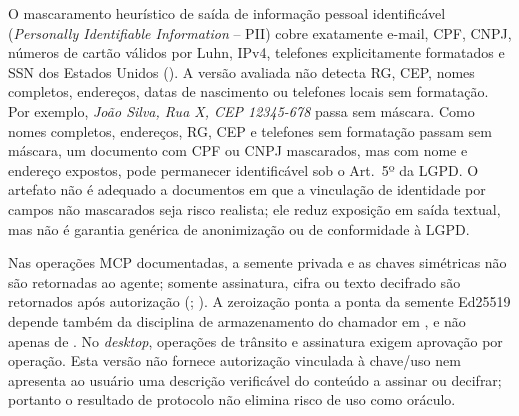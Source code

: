 O mascaramento heurístico de saída de informação pessoal identificável (\textit{Personally Identifiable Information} -- PII) cobre exatamente e-mail, CPF, CNPJ, números de cartão válidos por Luhn, IPv4, telefones explicitamente formatados e SSN dos Estados Unidos (). A versão avaliada não detecta RG, CEP, nomes completos, endereços, datas de nascimento ou telefones locais sem formatação. Por exemplo, \textit{João Silva, Rua X, CEP 12345-678} passa sem máscara. Como nomes completos, endereços, RG, CEP e telefones sem formatação passam sem máscara, um documento com CPF ou CNPJ mascarados, mas com nome e endereço expostos, pode permanecer identificável sob o Art.~5º da LGPD. O artefato não é adequado a documentos em que a vinculação de identidade por campos não mascarados seja risco realista; ele reduz exposição em saída textual, mas não é garantia genérica de anonimização ou de conformidade à LGPD.

Nas operações MCP documentadas, a semente privada e as chaves simétricas não são retornadas ao agente; somente assinatura, cifra ou texto decifrado são retornados após autorização (; ). A zeroização ponta a ponta da semente Ed25519 depende também da disciplina de armazenamento do chamador em , e não apenas de . No \textit{desktop}, operações de trânsito e assinatura exigem aprovação por operação. Esta versão não fornece autorização vinculada à chave/uso nem apresenta ao usuário uma descrição verificável do conteúdo a assinar ou decifrar; portanto o resultado de protocolo não elimina risco de uso como oráculo.

\label{nota:headless}

